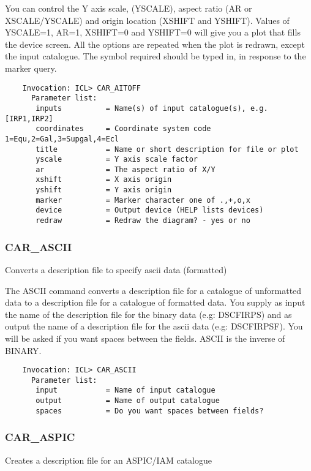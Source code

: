 You can control the Y axis scale, (YSCALE), aspect ratio (AR or
XSCALE/YSCALE) and origin location (XSHIFT and YSHIFT).
Values of YSCALE=1, AR=1, XSHIFT=0 and YSHIFT=0 will give you a plot
that fills the device screen.
All the options are repeated when the plot is redrawn, except the input
catalogue.
The symbol required should be typed in, in response to the marker query.

\begin{verbatim}
    Invocation: ICL> CAR_AITOFF
      Parameter list:
       inputs          = Name(s) of input catalogue(s), e.g. [IRP1,IRP2]
       coordinates     = Coordinate system code 1=Equ,2=Gal,3=Supgal,4=Ecl
       title           = Name or short description for file or plot
       yscale          = Y axis scale factor
       ar              = The aspect ratio of X/Y
       xshift          = X axis origin
       yshift          = Y axis origin
       marker          = Marker character one of .,+,o,x
       device          = Output device (HELP lists devices)
       redraw          = Redraw the diagram? - yes or no
\end{verbatim}

\subsubsection{CAR\_ASCII}

Converts a description file to specify ascii data (formatted)

The ASCII command converts a description file for a catalogue  of
unformatted  data  to a description file for a catalogue of formatted
data.
You supply as input the name of the description file for the
binary data (e.g: DSCFIRPS) and as output the name of a description
file for the ascii data (e.g: DSCFIRPSF).
You will be asked if you want spaces between the fields.
ASCII is the inverse of BINARY.

\begin{verbatim}
    Invocation: ICL> CAR_ASCII
      Parameter list:
       input           = Name of input catalogue
       output          = Name of output catalogue
       spaces          = Do you want spaces between fields?
\end{verbatim}

\subsubsection{CAR\_ASPIC}

Creates a description file for an ASPIC/IAM catalogue

